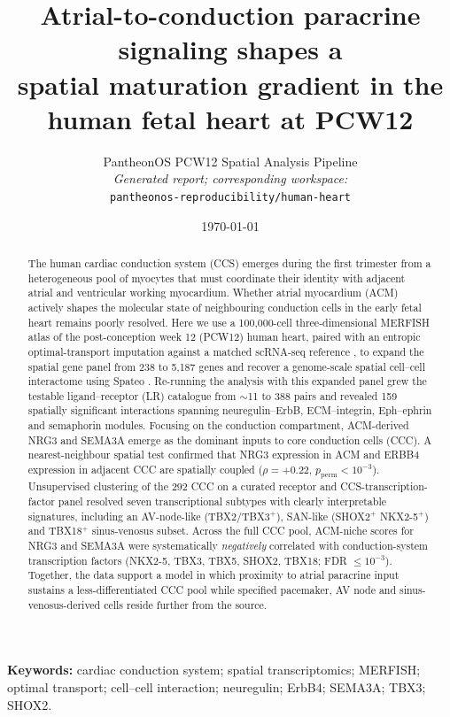 \documentclass[11pt,a4paper]{article}
\title{\bfseries\Large Atrial-to-conduction paracrine signaling shapes a\\
spatial maturation gradient in the human fetal heart at PCW12}
\author{%
PantheonOS PCW12 Spatial Analysis Pipeline\\
\textit{Generated report; corresponding workspace:}\\
\texttt{pantheonos-reproducibility/human-heart}%
}
\date{\today}
\begin{document}
\maketitle

\begin{abstract}
\noindent
The human cardiac conduction system (CCS) emerges during the first
trimester from a heterogeneous pool of myocytes that must coordinate
their identity with adjacent atrial and ventricular working myocardium.
Whether atrial myocardium (ACM) actively shapes the molecular state of
neighbouring conduction cells in the early fetal heart remains poorly
resolved. Here we use a 100,000-cell three-dimensional MERFISH atlas of
the post-conception week 12 (PCW12) human heart, paired with an entropic
optimal-transport imputation against a matched scRNA-seq reference
\citep{klein2025moscot}, to expand the spatial gene panel from 238 to
5{,}187 genes and recover a genome-scale spatial cell--cell interactome
using Spateo \citep{qiu2024spateo}. Re-running the analysis with this
expanded panel grew the testable ligand--receptor (LR) catalogue from
$\sim$11 to 388 pairs and revealed 159 spatially significant interactions
spanning neuregulin--ErbB, ECM--integrin, Eph--ephrin and semaphorin
modules. Focusing on the conduction compartment, ACM-derived NRG3 and
SEMA3A emerge as the dominant inputs to core conduction cells (CCC).
A nearest-neighbour spatial test confirmed that NRG3 expression in ACM
and ERBB4 expression in adjacent CCC are spatially coupled
($\rho{=}+0.22$, $p_{\text{perm}}{<}10^{-3}$). Unsupervised clustering of
the 292 CCC on a curated receptor and CCS-transcription-factor panel
resolved seven transcriptional subtypes with clearly interpretable
signatures, including an AV-node-like (TBX2/TBX3$^+$), SAN-like
(SHOX2$^+$ NKX2-5$^+$) and TBX18$^+$ sinus-venosus subset. Across the
full CCC pool, ACM-niche scores for NRG3 and SEMA3A were systematically
\emph{negatively} correlated with conduction-system transcription
factors (NKX2-5, TBX3, TBX5, SHOX2, TBX18; FDR ${\le}10^{-3}$). Together,
the data support a model in which proximity to atrial paracrine input
sustains a less-differentiated CCC pool while specified pacemaker, AV
node and sinus-venosus-derived cells reside further from the source.
\end{abstract}

\vspace{0.6em}
\noindent\textbf{Keywords:} cardiac conduction system; spatial
transcriptomics; MERFISH; optimal transport; cell--cell interaction;
neuregulin; ErbB4; SEMA3A; TBX3; SHOX2.
\end{document}
